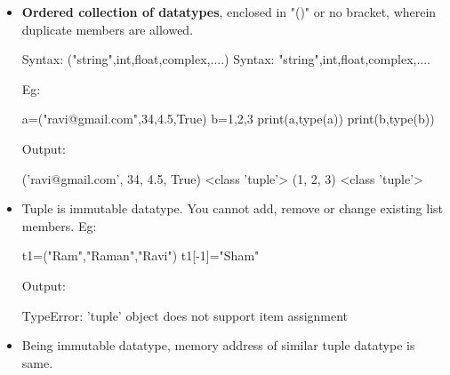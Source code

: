 
\begin{flushleft}
	\begin{itemize}
		\item \textbf{Ordered collection of datatypes}, enclosed in "()" or no bracket, wherein duplicate members are allowed.
		\begin{tcolorbox}[breakable,notitle,boxrule=1pt,colback=pink,colframe=pink]
			\color{black}
			\font=8pt
			Syntax: ("string",int,float,complex,....)
			\newline
			Syntax: "string",int,float,complex,....
			\font=4pt
		\end{tcolorbox}
		
		Eg:	
		\begin{tcolorbox}[breakable,notitle,boxrule=-0pt,colback=code,colframe=code]
			\color{white}
			\font=8pt
			a=("ravi@gmail.com",34,4.5,True)
			\newline
			b=1,2,3
			\newline
			print(a,type(a))
			\newline
			print(b,type(b))
			\font=4pt
		\end{tcolorbox}
		
		Output:
		\begin{tcolorbox}[breakable,notitle,boxrule=-0pt,colback=output,colframe=output]
			\color{black}
			('ravi@gmail.com', 34, 4.5, True) <class 'tuple'>
			\newline
			(1, 2, 3) <class 'tuple'>
			\font=4pt
		\end{tcolorbox}
		
		\bigskip
		
		\item Tuple is immutable datatype. You cannot add, remove or change existing list members.
		\newline
		Eg:			
		\begin{tcolorbox}[breakable,notitle,boxrule=-0pt,colback=code,colframe=code]
			\color{white}
			\font=8pt
			t1=("Ram","Raman","Ravi") \newline
			t1[-1]="Sham"
			\font=4pt
		\end{tcolorbox}
		
		Output:
		\begin{tcolorbox}[breakable,notitle,boxrule=-0pt,colback=error,colframe=error]
			\color{black}
			TypeError: 'tuple' object does not support item assignment
			\font=4pt
		\end{tcolorbox}
		
		\bigskip
		\item Being immutable datatype, memory address of similar tuple datatype is same.
		
	\end{itemize}
	
\end{flushleft}

\newpage

